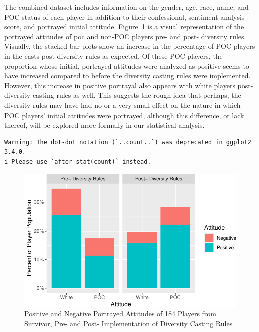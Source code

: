\documentclass[
  letterpaper,
  DIV=11,
  numbers=noendperiod,
  oneside]{scrartcl}
\begin{document}
The combined dataset includes information on the gender, age, race,
name, and POC status of each player in addition to their confessional,
sentiment analysis score, and portrayed initial attitude.
Figure~\ref{fig-3} is a visual representation of the portrayed attitudes
of poc and non-POC players pre- and post- diversity rules. Visually, the
stacked bar plots show an increase in the percentage of POC players in
the casts post-diversity rules as expected. Of these POC players, the
proportion whose initial, portrayed attitudes were analyzed as positive
seems to have increased compared to before the diversity casting rules
were implemented. However, this increase in positive portrayal also
appears with white players post- diversity casting rules as well. This
suggests the rough idea that perhaps, the diversity rules may have had
no or a very small effect on the nature in which POC players' initial
attitudes were portrayed, although this difference, or lack thereof,
will be explored more formally in our statistical analysis.

\begin{verbatim}
Warning: The dot-dot notation (`..count..`) was deprecated in ggplot2 3.4.0.
i Please use `after_stat(count)` instead.
\end{verbatim}

\begin{figure}

{\centering \includegraphics{Survivor_files/figure-pdf/fig-3-1.pdf}

}

\caption{\label{fig-3}Positive and Negative Portrayed Attitudes of 184
Players from Survivor, Pre- and Post- Implementation of Diversity
Casting Rules}

\end{figure}
\end{document}
